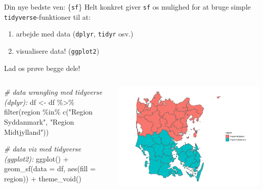 \documentclass[
  8pt,
  ignorenonframetext,
  aspectratio=169]{beamer}
\newenvironment{Shaded}{}{}
\newcommand{\AttributeTok}[1]{\textcolor[rgb]{0.49,0.56,0.16}{#1}}
\newcommand{\CommentTok}[1]{\textcolor[rgb]{0.38,0.63,0.69}{\textit{#1}}}
\newcommand{\FunctionTok}[1]{\textcolor[rgb]{0.02,0.16,0.49}{#1}}
\newcommand{\NormalTok}[1]{#1}
\newcommand{\OtherTok}[1]{\textcolor[rgb]{0.00,0.44,0.13}{#1}}
\newcommand{\SpecialCharTok}[1]{\textcolor[rgb]{0.25,0.44,0.63}{#1}}
\newcommand{\StringTok}[1]{\textcolor[rgb]{0.25,0.44,0.63}{#1}}
\newcommand{\columnsbegin}{\begin{columns}}
\newcommand{\columnsend}{\end{columns}}
\begin{document}
\begin{frame}[fragile]{Din nye bedste ven: \{\texttt{sf}\}}
\protect\hypertarget{din-nye-bedste-ven-sf-1}{}
Helt konkret giver \texttt{sf} os mulighed for at bruge simple
\texttt{tidyverse}-funktioner til at:

\begin{enumerate}
\item
  arbejde med data (\texttt{dplyr}, \texttt{tidyr} osv.)
\item
  visualisere data! (\texttt{ggplot2})
\end{enumerate}

Lad os prøve begge dele!

\columnsbegin
{}

\tiny

\begin{Shaded}
\begin{Highlighting}[]
\CommentTok{\# data wrangling med tidyverse (dplyr):}
\NormalTok{df }\OtherTok{\textless{}{-}}\NormalTok{ df }\SpecialCharTok{\%\textgreater{}\%} 
  \FunctionTok{filter}\NormalTok{(region }\SpecialCharTok{\%in\%} \FunctionTok{c}\NormalTok{(}\StringTok{"Region Syddanmark"}\NormalTok{, }\StringTok{"Region Midtjylland"}\NormalTok{))}

\CommentTok{\# data viz med tidyverse (ggplot2):}
\FunctionTok{ggplot}\NormalTok{() }\SpecialCharTok{+}
  \FunctionTok{geom\_sf}\NormalTok{(}\AttributeTok{data =}\NormalTok{ df, }\FunctionTok{aes}\NormalTok{(}\AttributeTok{fill =}\NormalTok{ region)) }\SpecialCharTok{+}
  \FunctionTok{theme\_void}\NormalTok{()}
\end{Highlighting}
\end{Shaded}

\normalsize


\tiny

\includegraphics{crashcourse_slides_files/figure-beamer/unnamed-chunk-9-1.pdf}

\normalsize \columnsend
\end{frame}
\end{document}
